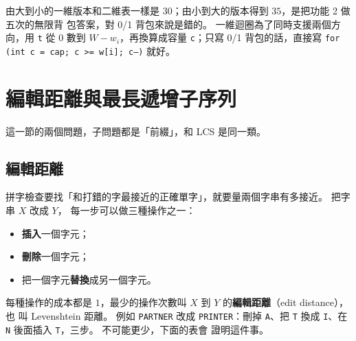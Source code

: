 由大到小的一維版本和二維表一樣是 $30$；由小到大的版本得到 $35$，是把功能 2 做五次的無限背
包答案，對 0/1 背包來說是錯的。 一維迴圈為了同時支援兩個方向，用 \texttt{t} 從 $0$ 數到
$W - w_i$，再換算成容量 \texttt{c}；只寫 0/1 背包的話，直接寫
\texttt{for (int c = cap; c >= w[i]; c--)} 就好。

\section{編輯距離與最長遞增子序列}
\label{sec:dp-edit-lis}

這一節的兩個問題，子問題都是「前綴」，和 LCS 是同一類。

\subsection{編輯距離}
\label{sec:dp-edit}

拼字檢查要找「和打錯的字最接近的正確單字」，就要量兩個字串有多接近。 把字串 $X$ 改成 $Y$，
每一步可以做三種操作之一：
\begin{itemize}
\item \textbf{插入}一個字元；
\item \textbf{刪除}一個字元；
\item 把一個字元\textbf{替換}成另一個字元。
\end{itemize}
每種操作的成本都是 $1$，最少的操作次數叫 $X$ 到 $Y$ 的\textbf{編輯距離}（edit distance），也
叫 Levenshtein 距離。 例如 \texttt{PARTNER} 改成 \texttt{PRINTER}：刪掉 \texttt{A}、把
\texttt{T} 換成 \texttt{I}、在 \texttt{N} 後面插入 \texttt{T}，三步。 不可能更少，下面的表會
證明這件事。

